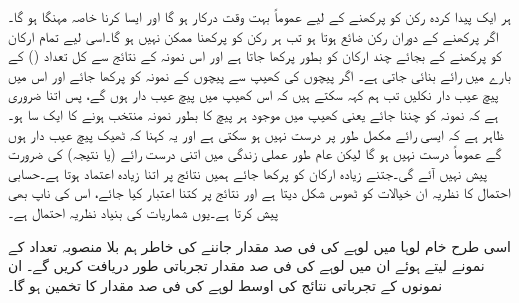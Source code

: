 ہر ایک پیدا کردہ رکن کو پرکھنے کے لیے عموماً بہت وقت درکار  ہو  گا اور ایسا کرنا خاصہ مہنگا ہو گا۔اگر پرکھنے کے دوران رکن ضائع ہوتا ہو تب ہر رکن کو پرکھنا ممکن نہیں ہو گا۔اسی لیے تمام ارکان کو پرکھنے کے بجائے چند ارکان کو بطور  پرکھا جاتا ہے اور اس نمونہ کے نتائج سے کل تعداد () کے بارے میں رائے بنائی جاتی ہے۔ اگر  پیچوں کی کھیپ  سے  پیچوں کے نمونہ کو پرکھا جائے اور اس میں  پیچ عیب دار نکلیں تب ہم کہہ سکتے ہیں کہ اس کھیپ میں  پیچ عیب دار ہوں گے، پس اتنا ضروری ہے کہ نمونہ کو   چننا جائے یعنی کھیپ میں موجود ہر پیچ کا بطور نمونہ منتخب ہونے کا  ایک سا  ہو۔ظاہر ہے کہ ایسی رائے مکمل طور پر درست نہیں ہو سکتی ہے اور یہ کہنا کہ ٹھیک  پیچ عیب دار ہوں گے عموماً  درست نہیں ہو گا لیکن عام طور عملی زندگی میں اتنی درست رائے (یا نتیجہ)  کی ضرورت پیش نہیں آئے گی۔جتنے زیادہ ارکان کو پرکھا جائے ہمیں نتائج پر اتنا زیادہ اعتماد ہوتا ہے۔حسابی احتمال کا نظریہ ان خیالات کو ٹھوس شکل دیتا ہے اور نتائج پر کتنا اعتبار کیا جائے، اس کی ناپ بھی پیش کرتا ہے۔یوں شماریات کی بنیاد  نظریہ احتمال ہے۔

اسی طرح خام لوہا میں لوہے کی فی صد مقدار  جاننے کی خاطر ہم  بلا منصوبہ   تعداد کے  نمونے لیتے ہوئے ان میں لوہے کی فی صد مقدار تجرباتی طور دریافت  کریں گے۔  ان   نمونوں کے تجرباتی نتائج  کی اوسط  لوہے کی فی صد مقدار  کا تخمین ہو گا۔

